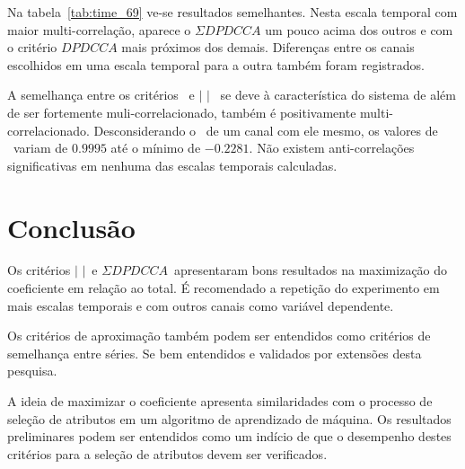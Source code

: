   Na tabela~\ref{tab:time_69} ve-se resultados semelhantes. Nesta escala temporal com maior multi-correlação, aparece o $\Sigma DPDCCA$ um pouco acima dos outros e com o critério $DPDCCA$ mais próximos dos demais. Diferenças entre os canais escolhidos em uma escala temporal para a outra também foram registrados.

  A semelhança entre os critérios \pdcca~e $|$ \pdcca $|$~ se deve à característica do sistema de além de ser fortemente muli-correlacionado, também é positivamente multi-correlacionado. Desconsiderando o \pdcca~de um canal com ele mesmo, os valores de \pdcca~variam de $0.9995$ até o mínimo de $-0.2281$. Não existem anti-correlações significativas em nenhuma das escalas temporais calculadas. 

  \section{Conclusão}

Os critérios $|$ \pdcca $|$~e $\Sigma DPDCCA$~apresentaram bons resultados na maximização do coeficiente \dmc em relação ao total. É recomendado a repetição do experimento em mais escalas temporais e com outros canais como variável dependente.

Os critérios de aproximação também podem ser entendidos como critérios de semelhança entre séries. Se bem entendidos e validados por extensões desta pesquisa.

A ideia de maximizar o coeficiente apresenta similaridades com o processo de seleção de atributos em um algoritmo de aprendizado de máquina. Os resultados preliminares podem ser entendidos como um indício de que o desempenho destes critérios para a seleção de atributos devem ser verificados.


 

